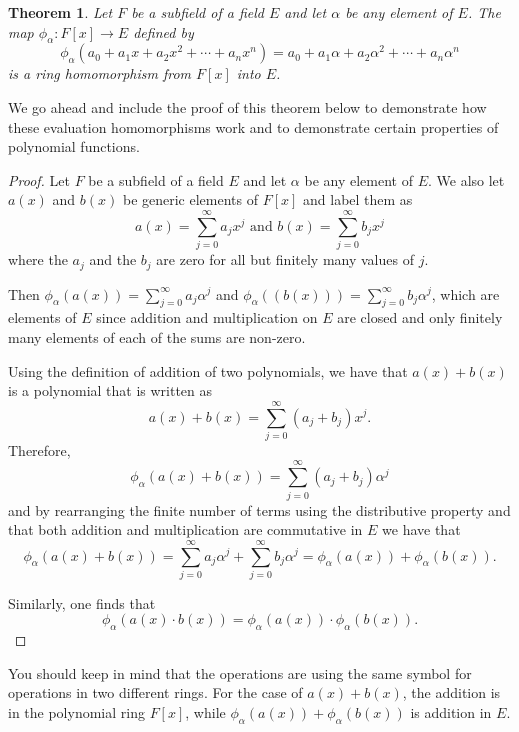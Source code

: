 \documentclass[
]{book}
\newtheorem{theorem}{Theorem}[chapter]
\theoremstyle{definition}
\theoremstyle{definition}
\theoremstyle{definition}
\theoremstyle{definition}
\theoremstyle{remark}
\begin{document}
\begin{theorem}
Let \(F\) be a subfield of a field \(E\) and let \(\alpha\) be any element of \(E\). The map \(\phi_\alpha: F[x] \rightarrow E\) defined by \[\phi_\alpha(a_0 + a_1 x + a_2 x^2 + \cdots + a_n x^n) = a_0 + a_1 \alpha + a_2 \alpha^2 + \cdots + a_n \alpha^n\] is a ring homomorphism from \(F[x]\) into \(E\).
\end{theorem}

We go ahead and include the proof of this theorem below to demonstrate how these evaluation homomorphisms work and to demonstrate certain properties of polynomial functions.

\begin{proof}
Let \(F\) be a subfield of a field \(E\) and let \(\alpha\) be any element of \(E\). We also let \(a(x)\) and \(b(x)\) be generic elements of \(F[x]\) and label them as
\[a(x) = \sum_{j=0}^\infty a_j x^j \mbox{ and } b(x)=\sum_{j=0}^\infty b_j x^j\] where the \(a_j\) and the \(b_j\) are zero for all but finitely many values of \(j\).

Then \(\phi_\alpha \left(a(x)\right) = \sum_{j=0}^\infty a_j \alpha^j\) and \(\phi_\alpha\left(\left(b(x)\right)\right) = \sum_{j=0}^\infty b_j \alpha^j\), which are elements of \(E\) since addition and multiplication on \(E\) are closed and only finitely many elements of each of the sums are non-zero.

Using the definition of addition of two polynomials, we have that \(a(x)+b(x)\) is a polynomial that is written as \[a(x)+b(x) = \sum_{j=0}^\infty (a_j+b_j) x^j.\]
Therefore,
\[\phi_\alpha \left(a(x)+b(x)\right) = \sum_{j=0}^\infty (a_j+b_j) \alpha^j\] and by rearranging the finite number of terms using the distributive property and that both addition and multiplication are commutative in \(E\) we have that
\[\phi_\alpha \left(a(x)+b(x)\right) = \sum_{j=0}^\infty a_j \alpha^j + \sum_{j=0}^\infty b_j \alpha^j = \phi_\alpha \left(a(x)\right) + \phi_\alpha \left(b(x)\right). \]

Similarly, one finds that
\[\phi_\alpha \left(a(x) \cdot b(x)\right) = \phi_\alpha (a(x)) \cdot \phi_\alpha(b(x)).\]
\end{proof}

You should keep in mind that the operations are using the same symbol for operations in two different rings. For the case of \(a(x)+b(x)\), the addition is in the polynomial ring \(F[x]\), while \(\phi_\alpha \left(a(x)\right) + \phi_\alpha \left(b(x)\right)\) is addition in \(E\).
\end{document}
